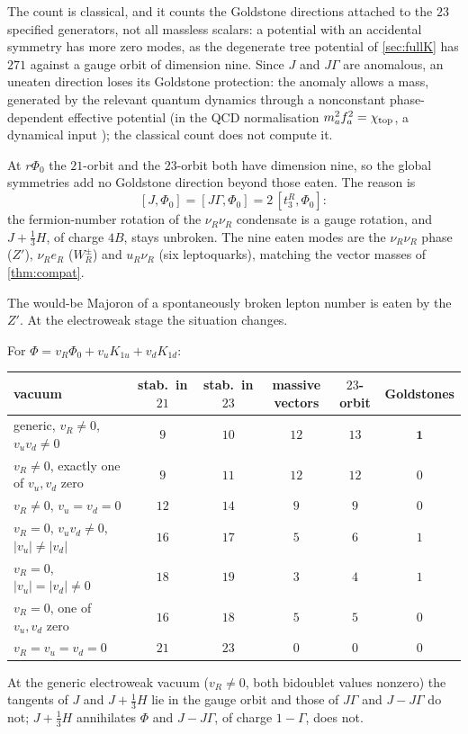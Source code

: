 The count is classical, and it counts the Goldstone directions attached to the $23$ specified generators, not all massless scalars: a potential with an
accidental symmetry has more zero modes, as the degenerate tree potential of \cref{sec:fullK} has $271$ against a gauge orbit of dimension nine. Since $J$
and $J\Gamma$ are anomalous, an uneaten direction loses its Goldstone protection: the anomaly allows a mass, generated by the relevant quantum
dynamics through a nonconstant phase-dependent effective potential (in the QCD normalisation $m_a^2f_a^2=\chi_{\rm top}$, a dynamical input
\cite{GrilliDiCortona16}); the classical count does not compute it.

\begin{theorem}[No Majoron]
\label{thm:nomajoron}
At $r\Phi_0$ the $21$-orbit and the $23$-orbit both have dimension nine, so the global symmetries add no Goldstone direction beyond those eaten. The reason is
\[
[J,\Phi_0]=[J\Gamma,\Phi_0]=2\,[t^R_3,\Phi_0]:
\]
the fermion-number rotation of the $\nu_R\nu_R$ condensate is a gauge rotation, and $J+\tfrac13H$, of charge $4B$, stays unbroken. The nine eaten modes are the
$\nu_R\nu_R$ phase ($Z'$), $\nu_Re_R$ ($W_R^\pm$) and $u_R\nu_R$ (six leptoquarks), matching the vector masses of \cref{thm:compat}.
\end{theorem}

The would-be Majoron of a spontaneously broken lepton number is eaten by the $Z'$. At the electroweak stage the situation changes.

\begin{theorem}
\label{thm:axion}
For $\Phi=v_R\Phi_0+v_uK_{1u}+v_dK_{1d}$:
\begin{center}
\small
\begin{tabular}{@{}lccccc@{}}
\toprule
vacuum & stab.\ in $21$ & stab.\ in $23$ & massive vectors & $23$-orbit & Goldstones\\
\midrule
generic, $v_R\neq0$, $v_uv_d\neq0$ & $9$ & $10$ & $12$ & $13$ & $\mathbf1$\\
$v_R\neq0$, exactly one of $v_u,v_d$ zero & $9$ & $11$ & $12$ & $12$ & $0$\\
$v_R\neq0$, $v_u=v_d=0$ & $12$ & $14$ & $9$ & $9$ & $0$\\
$v_R=0$, $v_uv_d\neq0$, $|v_u|\neq|v_d|$ & $16$ & $17$ & $5$ & $6$ & $1$\\
$v_R=0$, $|v_u|=|v_d|\neq0$ & $18$ & $19$ & $3$ & $4$ & $1$\\
$v_R=0$, one of $v_u,v_d$ zero & $16$ & $18$ & $5$ & $5$ & $0$\\
$v_R=v_u=v_d=0$ & $21$ & $23$ & $0$ & $0$ & $0$\\
\bottomrule
\end{tabular}
\end{center}
At the generic electroweak vacuum ($v_R\neq0$, both bidoublet values nonzero) the tangents of $J$ and $J+\tfrac13H$ lie in the gauge orbit and those of $J\Gamma$ and $J-J\Gamma$ do not; $J+\tfrac13H$ annihilates $\Phi$
and $J-J\Gamma$, of charge $1-\Gamma$, does not.
\end{theorem}

